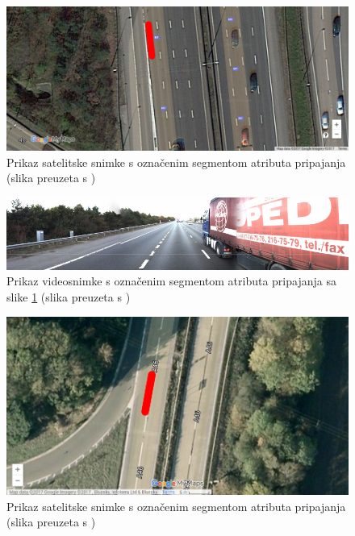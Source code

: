 \documentclass[times, utf8, diplomski, numeric]{fer}
\begin{document}
\begin{figure}[H]
\centering
\includegraphics[scale=0.35]{images/sattelite_merge_lane_irap.png}
\caption{Prikaz satelitske snimke s označenim segmentom atributa pripajanja (slika preuzeta s \citep{url:google_maps})}
\label{img:sattelite_merge_lane_irap}
\end{figure}

\begin{figure}[H]
\centering
\includegraphics[scale=0.5]{images/video_merge_lane_irap.png}
\caption{Prikaz videosnimke s označenim segmentom atributa pripajanja sa slike \ref{img:sattelite_merge_lane_irap} (slika preuzeta s \citep{url:ftts_irap})}
\label{img:video_merge_lane_irap}
\end{figure}

\begin{figure}[H]
\centering
\includegraphics[scale=0.35]{images/sattelite_merge_lane_irap2.png}
\caption{Prikaz satelitske snimke s označenim segmentom atributa pripajanja (slika preuzeta s \citep{url:google_maps})}
\label{img:sattelite_merge_lane_irap2}
\end{figure}
\end{document}
